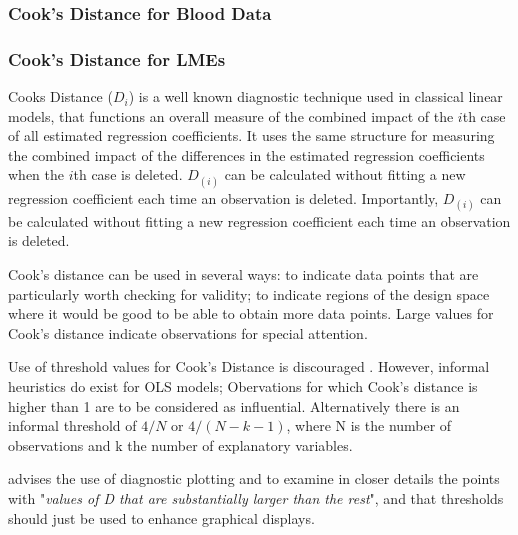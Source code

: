 \documentclass[12pt, a4paper]{report}
\theoremstyle{plain}
\theoremstyle{definition}
\theoremstyle{remark}
\begin{document}
	
	
	
	
	
	
	
	
	\subsubsection{Cook's Distance for Blood Data}
	


	
	

	
	\subsubsection{Cook's Distance for LMEs} %

		
	
	 Cooks Distance ($D_{i}$) is a well known diagnostic technique used in classical linear models, that functions an overall measure of the combined impact of the $i$th case of all estimated regression coefficients. It uses the same structure for measuring the combined impact of the differences in the estimated regression coefficients when the $i$th case is deleted. $D_{(i)}$ can be calculated without fitting a new regression coefficient each time an observation is deleted. Importantly, $D_{(i)}$ can be calculated without fitting a new regression coefficient each time an observation is deleted.
	
	
	Cook's distance can be used in several ways: to indicate data points that are particularly worth checking for validity; to indicate regions of the design space where it would be good to be able to obtain more data points. 
	Large values for Cook's distance indicate observations for special attention. 

		
	Use of threshold values for Cook's Distance is discouraged \citep{fox1997}. However, informal heuristics do exist for OLS models; Obervations for which Cook's distance is higher than 1 are to be considered as influential. Alternatively there is an informal threshold of $4/N$ or $4/(N−k−1)$, where N is the number of observations and k the number of explanatory variables.
	
	
	
	\citet{fox1997} advises the use of diagnostic plotting and to examine in closer details the points with "\textit{values of D that are substantially larger than the rest}", and that thresholds should just be used to enhance graphical displays.
\end{document}
